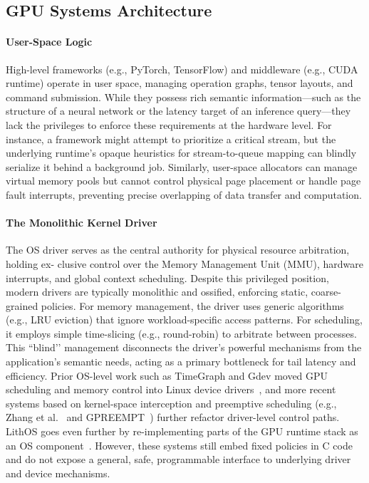\subsection{GPU Systems Architecture}

\paragraph{ User-Space Logic}
High-level frameworks (e.g., PyTorch, TensorFlow) and middleware (e.g., CUDA runtime) operate in user space, managing operation graphs, tensor layouts, and command submission. While they possess rich semantic information---such as the structure of a neural network or the latency target of an inference query---they lack the privileges to enforce these requirements at the hardware level. For instance, a framework might attempt to prioritize a critical stream, but the underlying runtime's opaque heuristics for stream-to-queue mapping can blindly serialize it behind a background job. Similarly, user-space allocators can manage virtual memory pools but cannot control physical page placement or handle page fault interrupts, preventing precise overlapping of data transfer and computation.

\paragraph{The Monolithic Kernel Driver}
The OS driver serves as the
central authority for physical resource arbitration, holding ex-
clusive control over the Memory Management Unit (MMU),
hardware interrupts, and global context scheduling. Despite
this privileged position, modern drivers are typically monolithic and ossified, enforcing static, coarse-grained policies.
For memory management, the driver uses generic algorithms
(e.g., LRU eviction) that ignore workload-specific access patterns.
For scheduling, it employs simple time-slicing (e.g., round-robin) to arbitrate between processes. This “blind’’ management disconnects the driver’s powerful mechanisms from the application’s semantic needs, acting as a primary bottleneck for tail latency and efficiency. 
Prior OS-level work such as TimeGraph and Gdev moved
GPU scheduling and memory control into Linux device drivers~\cite{timegraph,gdev}, and more recent systems based on
kernel-space interception and preemptive scheduling (e.g.,
Zhang et al.~\cite{kernelintercept} and GPREEMPT~\cite{gpreempt})
further refactor driver-level control paths. LithOS goes even
further by re-implementing parts of the GPU runtime stack as
an OS component~\cite{lithos}. However, these systems still
embed fixed policies in C code and do not expose a general,
safe, programmable interface to underlying driver and device
mechanisms.


